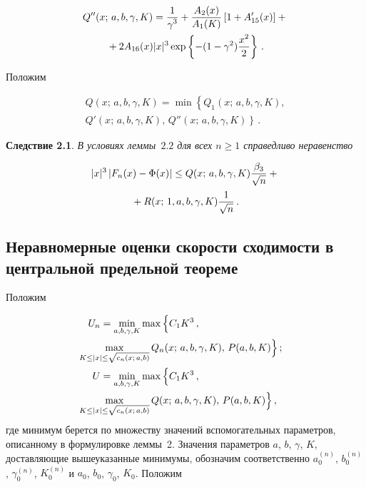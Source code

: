 \begin{multicols}{2}
\noindent
\begin{multline}
Q''(x;\,a,b,\gamma,K)=\displaystyle\frac{\displaystyle 1\mathstrut}{\displaystyle \gamma^{3}\mathstrut}+\displaystyle\frac{\displaystyle A_2(x)\mathstrut}{\displaystyle A_1(K)\mathstrut}\left[1+A'_{15}(x)\right]
+{}\\
{}+2A_{16}(x)|x|^{3}\exp\left\{-(1-\gamma^2)\displaystyle\frac{\displaystyle x^2\mathstrut}{\displaystyle 2\mathstrut}\right\}\,.\label{e26gv}
\end{multline}

Положим

\noindent
\begin{multline*}
Q(x;\,a,b,\gamma,K)=\min\left\{Q_1(x;\,a,b,\gamma,K),\right.\\
\left.Q'(x;\,a,b,\gamma,K),\,Q''(x;\,a,b,\gamma,K)\right\}\,.
\end{multline*}


\noindent
\textbf{Следствие 2.1}. \textit{В условиях леммы~$2.2$ для всех $n\ge1$
справедливо неравенство}

\noindent
\begin{multline*}
|x|^{3}\left|F_n(x)-\Phi(x)\right|\le
Q(x;\,a,b,\gamma,K)\displaystyle\frac{\displaystyle \beta_{3}\mathstrut}{\displaystyle \sqrt{n}\mathstrut}+{}\\
{}+R(x;\,1,a,b,\gamma,K)\displaystyle\frac{\displaystyle 1\mathstrut}{\displaystyle \sqrt{n}\mathstrut}\,.
\end{multline*}

\subsection{Неравномерные оценки скорости сходимости в центральной предельной теореме}

Положим

\noindent
\begin{align*}
U_n&=\min_{a,b,\gamma,K}\max\Big\{C_1
K^{\dd}\,,\\
&\hspace*{-8mm}\max_{K\le|x|\le\sqrt{c_n(x;\,a,b)}}Q_n(x;\,a,b,\gamma,K),\,
P(a,b,K)\Big\}\,;\\
U&=\min_{a,b,\gamma,K}\max\Big\{C_1
K^{\dd}\,,\\
&\hspace*{-8mm}\max_{K\le|x|\le\sqrt{c_n(x;\,a,b)}}Q(x;\,a,b,\gamma,K),\,
P(a,b,K)\Big\}\,,
\end{align*}
где минимум берется по множеству значений вспомогательных
параметров, описанному в формулировке леммы~2. Значения параметров
$a$, $b$, $\gamma$, $K$, доставляющие вышеуказанные минимумы,
обозначим соответственно $a^{(n)}_0$, $b^{(n)}_0$,
$\gamma^{(n)}_0$, $K^{(n)}_0$ и $a_0$, $b_0$, $\gamma_0$, $K_0$.
Положим


\end{multicols}
